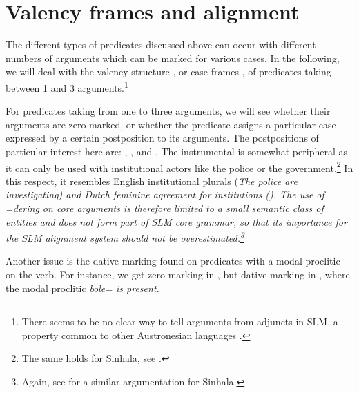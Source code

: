 \chapter{Valency frames and alignment}\label{sec:argstr}
The different types of predicates discussed above can occur with different numbers of arguments which can be marked for various cases. In the following, we will deal with the valency structure \citep{Bickel2004syntexp}, or case frames \citep{Tsunoda2004issues}, of predicates taking between 1 and 3 arguments.\footnote{There seems to be no clear way to tell arguments from adjuncts in SLM, a property common to other Austronesian languages \citep[158]{Himmelmann2005typochar}.}

For predicates taking from one to three arguments, we will see whether their arguments are zero-marked, or whether the predicate assigns a particular case expressed by a certain postposition to its arguments. The postpositions of particular interest here are: , , and . The instrumental is somewhat peripheral as it can only be used with institutional actors like the police or the government.\footnote{The same holds for Sinhala, see \citet[14]{Gair1991infl}.} In this respect, it resembles English institutional plurals (\em The police are investigating\em) and Dutch feminine agreement for institutions (). The use of \em =dering \em on core arguments is therefore limited to a small semantic class of entities and does not form part of SLM core grammar, so that its importance for the SLM alignment system should not be overestimated.\footnote{Again, see \citet[14]{Gair1991infl} for a similar argumentation for Sinhala.}

Another issue is the dative marking found on predicates with a modal proclitic on the verb. For instance, we get zero marking in , but dative marking in , where the modal proclitic \em bole= \em is present.




